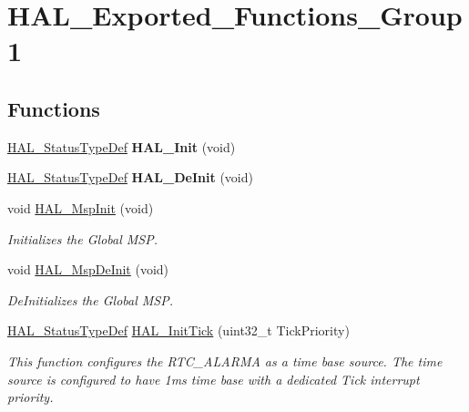 \hypertarget{group___h_a_l___exported___functions___group1}{}\section{H\+A\+L\+\_\+\+Exported\+\_\+\+Functions\+\_\+\+Group1}
\label{group___h_a_l___exported___functions___group1}
\subsection*{Functions}
\begin{DoxyCompactItemize}
\item 
\mbox{\label{group___h_a_l___exported___functions___group1_gaecac54d350c3730e6831eb404e557dc4}} 
\hyperlink{stm32f0xx__hal__def_8h_a63c0679d1cb8b8c684fbb0632743478f}{H\+A\+L\+\_\+\+Status\+Type\+Def} {\bfseries H\+A\+L\+\_\+\+Init} (void)
\item 
\mbox{\label{group___h_a_l___exported___functions___group1_ga95911129a26afb05232caaaefa31956f}} 
\hyperlink{stm32f0xx__hal__def_8h_a63c0679d1cb8b8c684fbb0632743478f}{H\+A\+L\+\_\+\+Status\+Type\+Def} {\bfseries H\+A\+L\+\_\+\+De\+Init} (void)
\item 
void \hyperlink{group___h_a_l___exported___functions___group1_gae4fb8e66865c87d0ebab74a726a6891f}{H\+A\+L\+\_\+\+Msp\+Init} (void)
\begin{DoxyCompactList}\small\item\em Initializes the Global M\+SP. \end{DoxyCompactList}\item 
void \hyperlink{group___h_a_l___exported___functions___group1_gadd10d026ef02d00e32e80c9eab9db830}{H\+A\+L\+\_\+\+Msp\+De\+Init} (void)
\begin{DoxyCompactList}\small\item\em De\+Initializes the Global M\+SP. \end{DoxyCompactList}\item 
\hyperlink{stm32f0xx__hal__def_8h_a63c0679d1cb8b8c684fbb0632743478f}{H\+A\+L\+\_\+\+Status\+Type\+Def} \hyperlink{group___h_a_l___exported___functions___group1_ga879cdb21ef051eb81ec51c18147397d5}{H\+A\+L\+\_\+\+Init\+Tick} (uint32\+\_\+t Tick\+Priority)
\begin{DoxyCompactList}\small\item\em This function configures the R\+T\+C\+\_\+\+A\+L\+A\+R\+MA as a time base source. The time source is configured to have 1ms time base with a dedicated Tick interrupt priority. \end{DoxyCompactList}\end{DoxyCompactItemize}


